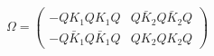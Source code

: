 \begin{equation}
\Omega= \left( \begin{array}{cc}
-Q K_1 Q K_1 Q & Q \bar{K}_2Q \bar{K}_2 Q  \\
-Q \bar{K}_1 Q \bar{K}_1 Q & Q K_2 Q K_2 Q
\end{array} \right)
\end{equation}

